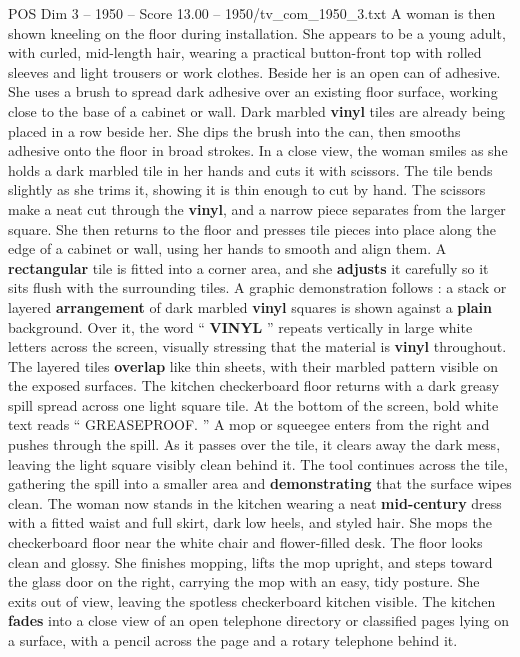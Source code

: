 \begin{textsample}{POS Dim 3 – 1950 – Score 13.00 – 1950/tv\_com\_1950\_3.txt}
A woman is then shown kneeling on the floor during installation.
She appears to be a young adult, with curled, mid-length hair, wearing a practical button-front top with rolled sleeves and light trousers or work clothes.
Beside her is an open can of adhesive.
She uses a brush to spread dark adhesive over an existing floor surface, working close to the base of a cabinet or wall.
Dark marbled \textbf{vinyl} tiles are already being placed in a row beside her.
She dips the brush into the can, then smooths adhesive onto the floor in broad strokes.
In a close view, the woman smiles as she holds a dark marbled tile in her hands and cuts it with scissors.
The tile bends slightly as she trims it, showing it is thin enough to cut by hand.
The scissors make a neat cut through the \textbf{vinyl}, and a narrow piece separates from the larger square.
She then returns to the floor and presses tile pieces into place along the edge of a cabinet or wall, using her hands to smooth and align them.
A \textbf{rectangular} tile is fitted into a corner area, and she \textbf{adjusts} it carefully so it sits flush with the surrounding tiles.
A graphic demonstration follows : a stack or layered \textbf{arrangement} of dark marbled \textbf{vinyl} squares is shown against a \textbf{plain} background.
Over it, the word “ \textbf{VINYL} ” repeats vertically in large white letters across the screen, visually stressing that the material is \textbf{vinyl} throughout.
The layered tiles \textbf{overlap} like thin sheets, with their marbled pattern visible on the exposed surfaces.
The kitchen checkerboard floor returns with a dark greasy spill spread across one light square tile.
At the bottom of the screen, bold white text reads “ GREASEPROOF. ” A mop or squeegee enters from the right and pushes through the spill.
As it passes over the tile, it clears away the dark mess, leaving the light square visibly clean behind it.
The tool continues across the tile, gathering the spill into a smaller area and \textbf{demonstrating} that the surface wipes clean.
The woman now stands in the kitchen wearing a neat \textbf{mid-century} dress with a fitted waist and full skirt, dark low heels, and styled hair.
She mops the checkerboard floor near the white chair and flower-filled desk.
The floor looks clean and glossy.
She finishes mopping, lifts the mop upright, and steps toward the glass door on the right, carrying the mop with an easy, tidy posture.
She exits out of view, leaving the spotless checkerboard kitchen visible.
The kitchen \textbf{fades} into a close view of an open telephone directory or classified pages lying on a surface, with a pencil across the page and a rotary telephone behind it.

\end{textsample}
